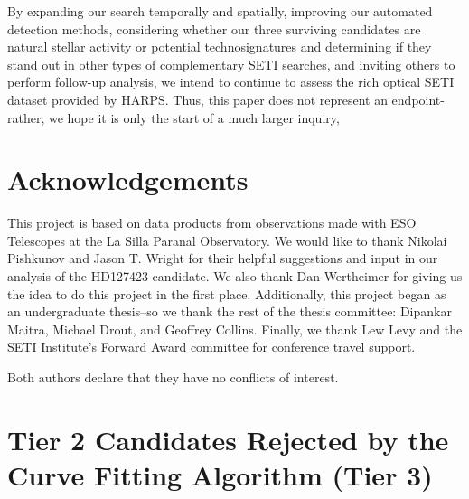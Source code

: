 \documentclass[twocolumn]{aastex701}
\begin{document}
By expanding our search temporally and spatially, improving our automated detection methods, considering whether our three surviving candidates are natural stellar activity or potential technosignatures and determining if they stand out in other types of complementary SETI searches, and inviting others to perform follow-up analysis, we intend to continue to assess the rich optical SETI dataset provided by HARPS. Thus, this paper does not represent an endpoint-rather, we hope it is only the start of a much larger inquiry,


\section{Acknowledgements}
This project is based on data products from observations made with ESO Telescopes at the La Silla Paranal Observatory. We would like to thank Nikolai Pishkunov and Jason T. Wright for their helpful suggestions and input in our analysis of the HD127423 candidate. We also thank Dan Wertheimer for giving us the idea to do this project in the first place. Additionally, this project began as an undergraduate thesis--so we thank the rest of the thesis committee: Dipankar Maitra, Michael Drout, and Geoffrey Collins. Finally, we thank Lew Levy and the SETI Institute's Forward Award committee for conference travel support.


Both authors declare that they have no conflicts of interest.

\appendix

\section{Tier 2 Candidates Rejected by the Curve Fitting Algorithm (Tier 3)}
\label{s:rejects}
\end{document}
